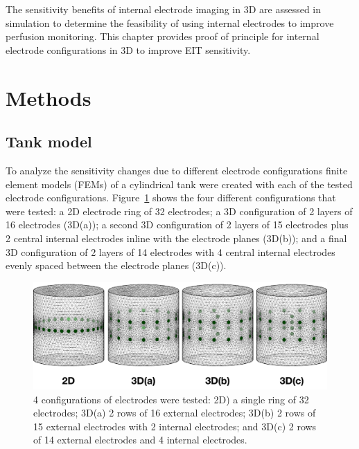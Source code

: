 The sensitivity benefits of internal electrode imaging in 3D are assessed
in simulation to determine the feasibility of using internal electrodes 
to improve perfusion monitoring. 
This chapter provides proof of principle for internal electrode configurations 
in 3D to 
improve EIT sensitivity.

\section{Methods}

\subsection{Tank model}
To analyze the sensitivity changes due to different electrode 
configurations finite element models (FEMs) of a cylindrical tank were 
created with each of the tested electrode configurations. Figure~\ref{fig:tank_FEM} shows the four 
different configurations that were tested: a 2D 
electrode ring of 32 electrodes; a 3D configuration of 2 layers of 16 
electrodes (3D(a)); a second 3D configuration of 2 layers of 15 electrodes 
plus 2 central internal electrodes inline with the electrode planes (3D(b)); and a final 3D configuration of 
2 layers of 14 electrodes with 4 central internal electrodes evenly spaced between the electrode planes (3D(c)).

\begin{figure}
\centering
\includegraphics[width=\textwidth]{chapter6-internal_electrodes/imgs/FEM_Comparison.pdf}
\caption[Internal electrode configurations]{4 configurations of electrodes were tested: 2D) a single ring of 32 electrodes; 
	3D(a) 2 rows of 16 external electrodes; 3D(b) 2 rows of 15 external electrodes with 2 internal electrodes; and 3D(c) 2 rows 
of 14 external electrodes and 4 internal electrodes.}
\label{fig:tank_FEM}
\end{figure}


